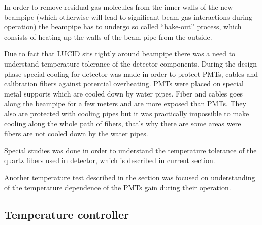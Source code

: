 In order to remove residual gas molecules from the inner walls of the new beampipe (which otherwise will lead to significant beam-gas interactions during operation)
the beampipe has to undergo so called ``bake-out'' process, which consists of heating up the walls of the beam pipe from the outside.

Due to fact that LUCID sits tightly around beampipe there was a need to understand temperature tolerance of the detector components.
During the design phase special cooling for detector was made in order to protect PMTs, cables and calibration fibers against potential overheating.
PMTs were placed on special metal supports which are cooled down by water pipes.
Fiber and cables goes along the beampipe for a few meters and are more exposed than PMTs.
They also are protected with cooling pipes but it was practically impossible to make cooling along the whole path of fibers,
that's why there are some areas were fibers are not cooled down by the water pipes.

Special studies was done in order to understand the temperature tolerance of the quartz fibers used in detector, which is described in current section.


Another temperature test described in the section was focused on understanding of the temperature dependence of the PMTs gain during their operation.









\subsection{Temperature controller}
\label{subsec:tempController}

